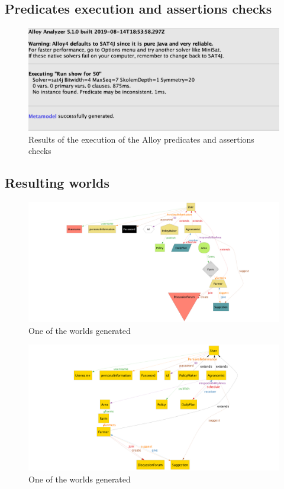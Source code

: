 \documentclass[../../main.tex]{subfiles}
\begin{document}
\subsection{Predicates execution and assertions checks}

\begin{figure}[H]
  \centering
  \includegraphics[width=\textwidth]{RASD/image/redicates_execution_and assertions_checks.jpg}
  \caption{Results of the execution of the Alloy predicates and assertions checks}
\end{figure}

\subsection{Resulting worlds}

\begin{figure}[H]
  \centering
  \includegraphics[width=\textwidth]{RASD/image/Alloy.png}
  \caption{One of the worlds generated}
\end{figure}

\begin{figure}[H]
  \centering
  \includegraphics[width=\textwidth]{RASD/image/Alloy2.png}
  \caption{One of the worlds generated}
\end{figure}
\end{document}
